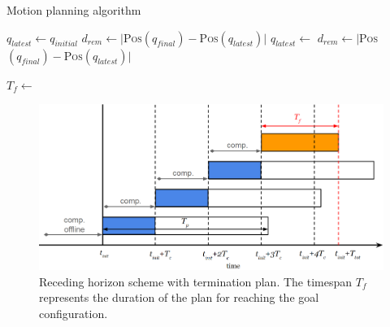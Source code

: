 \documentclass[eprint]{actapoly}
\begin{document}
\begin{algorithm}
    \caption{Motion planning algorithm\label{cod:algo}}
    \label{swpa}
    \begin{algorithmic}[1] %
	    \State $q_{latest} \gets q_{initial}$
	    \State $d_{rem} \gets |${\scshape Pos}$(q_{final}) - ${\scshape Pos}$(q_{latest})|$
	    \State {}
		\State $q_{latest} \gets $
		\State $d_{rem} \gets |${\scshape Pos}$(q_{final}) - ${\scshape Pos}$(q_{latest})|$
		
	    \EndWhile\label{planningwhile}
	    \State {}
	    \State $T_f \gets $
	    
        \EndProcedure
    \end{algorithmic}
\end{algorithm}

\begin{figure}[!h]
  \centering
  \includegraphics[width=\linewidth]{./images/receding_horizon/motionplanning2.png} %
  \caption{Receding horizon scheme with termination plan. The timespan $T_f$ represents the duration of the plan for reaching the goal configuration.\label{fig:recedinghor}}
\end{figure}
\end{document}
